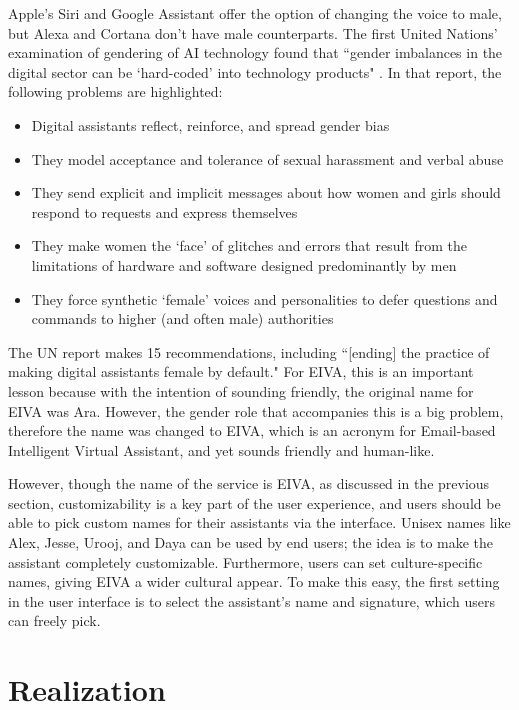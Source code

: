 \documentclass{article}
\begin{document}
Apple's Siri and Google Assistant offer the option of changing the voice to male, but Alexa and Cortana don't have male counterparts. The first United Nations' examination of gendering of AI technology found that ``gender imbalances in the digital sector can be `hard-coded' into technology products" \cite{noauthor_id_nodate}. In that report, the following problems are highlighted:

\begin{itemize}
	\item Digital assistants reflect, reinforce, and spread gender bias
	\item They model acceptance and tolerance of sexual harassment and verbal abuse
	\item They send explicit and implicit messages about how women and girls should respond to requests and express themselves
	\item They make women the ‘face’ of glitches and errors that result from the limitations of hardware and software designed predominantly by men
	\item They force synthetic ‘female’ voices and personalities to defer questions and commands to higher (and often male) authorities
\end{itemize}

The UN report makes 15 recommendations, including ``[ending] the practice of making digital assistants female by default." For EIVA, this is an important lesson because with the intention of sounding friendly, the original name for EIVA was Ara. However, the gender role that accompanies this is a big problem, therefore the name was changed to EIVA, which is an acronym for Email-based Intelligent Virtual Assistant, and yet sounds friendly and human-like.

However, though the name of the service is EIVA, as discussed in the previous section, customizability is a key part of the user experience, and users should be able to pick custom names for their assistants via the interface. Unisex names like Alex, Jesse, Urooj, and Daya can be used by end users; the idea is to make the assistant completely customizable. Furthermore, users can set culture-specific names, giving EIVA a wider cultural appear. To make this easy, the first setting in the user interface is to select the assistant's name and signature, which users can freely pick.

\newpage

\section{Realization}
\end{document}
